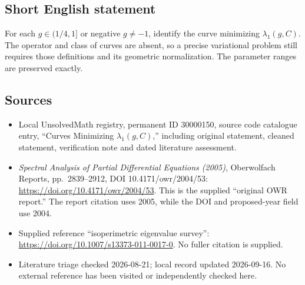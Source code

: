 \documentclass[11pt]{article}
\begin{document}
\subsection{Short English statement}
For each \(g\in(1/4,1]\) or negative \(g\ne-1\), identify the curve minimizing \(\lambda_1(g,C)\). The operator and class of curves are absent, so a precise variational problem still requires those definitions and its geometric normalization. The parameter ranges are preserved exactly.
\subsection{Sources}
\begin{itemize}
\item Local UnsolvedMath registry, permanent ID 30000150, source code catalogue entry, ``Curves Minimizing \(\lambda_1(g,C)\),'' including original statement, cleaned statement, verification note and dated literature assessment.
\item \emph{Spectral Analysis of Partial Differential Equations (2005)}, Oberwolfach Reports, pp.\ 2839--2912, DOI 10.4171/owr/2004/53: \url{https://doi.org/10.4171/owr/2004/53}. This is the supplied ``original OWR report.'' The report citation uses 2005, while the DOI and proposed-year field use 2004.
\item Supplied reference ``isoperimetric eigenvalue survey'': \url{https://doi.org/10.1007/s13373-011-0017-0}. No fuller citation is supplied.
\item Literature triage checked 2026-08-21; local record updated 2026-09-16. No external reference has been visited or independently checked here.
\end{itemize}
\end{document}
